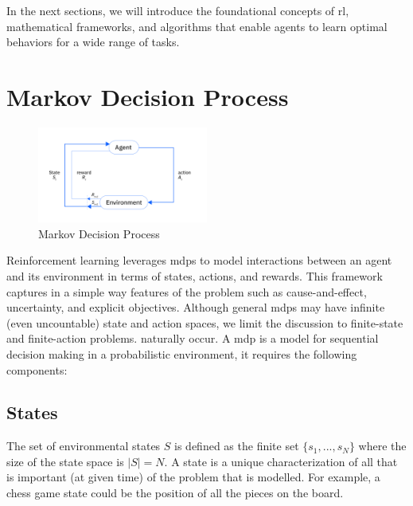 \documentclass[a4paper,11pt]{report}
\theoremstyle{definition}
\theoremstyle{plain}
\begin{document}

% 
% 
% 
% 

% 
% 
% 
% 
% 

In the next sections, we will introduce the foundational concepts of \gls{rl}, 
mathematical frameworks, and algorithms that enable agents to learn optimal behaviors for 
a wide range of tasks.


\section{Markov Decision Process}
\begin{figure}
    \centering
    \includegraphics[width=0.5\textwidth]{images/MDP.png}
    \caption{Markov Decision Process}
    \label{fig:mdp}
\end{figure}

Reinforcement learning leverages \gls{mdp}s to model interactions between 
an agent and its environment in terms of states, actions, and rewards. 
This framework captures in a simple way features of the problem such as cause-and-effect, 
uncertainty, and explicit objectives.
Although general \gls{mdp}s may have infinite (even uncountable) state and action
spaces, we limit the discussion to finite-state and finite-action problems.
naturally occur.
A \gls{mdp} is a model for sequential decision making in a probabilistic environment, it requires
the following components:

\subsection*{States}
The set of environmental states $S$ is defined as the finite set $\{s_1 , . . . , s_N \}$ where the
size of the state space is $|S| = N$. A state is a unique characterization of all
that is important (at given time) of the problem that is modelled. For example, a chess game state 
could be the position of all the pieces on the board.
\end{document}
